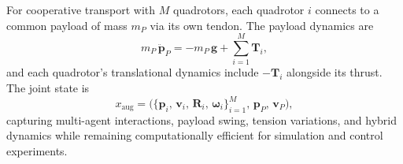 For cooperative transport with \(M\) quadrotors, each quadrotor \(i\) connects to a common payload of mass \(m_P\) via its own tendon. The payload dynamics are
\begin{equation}
m_P \,\ddot{\mathbf{p}}_P = -m_P\,\mathbf{g} + \sum_{i=1}^M \mathbf{T}_i,
\end{equation}
and each quadrotor's translational dynamics include \(-\mathbf{T}_i\) alongside its thrust. The joint state is
\begin{equation}
x_{\mathrm{aug}} = \bigl(\{\mathbf{p}_i,\,\mathbf{v}_i,\,\mathbf{R}_i,\,\boldsymbol{\omega}_i\}_{i=1}^M,\,\mathbf{p}_P,\,\mathbf{v}_P\bigr),
\end{equation}
capturing multi-agent interactions, payload swing, tension variations, and hybrid dynamics while remaining computationally efficient for simulation and control experiments.